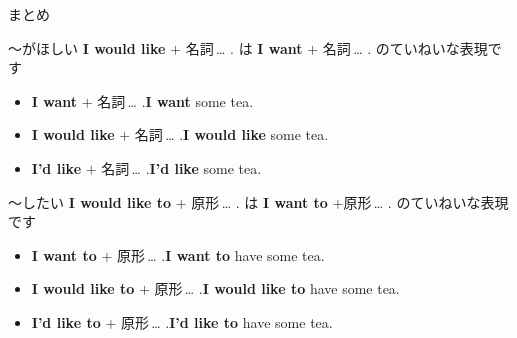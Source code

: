\documentclass[aspectratio=169,xcolor={dvipsnames,table}]{beamer}
\begin{document}
\begin{frame}[plain]{まとめ}
 \begin{block}{～がほしい}\small
\textbf{I would like} $+$ 名詞\,\ldots\,\,.\,\,は\,\,\textbf{I want} $+$ 名詞\,\ldots\,\,.\,\,のていねいな表現です
\begin{itemize}[square]\small
 \item \textbf{I want} $+$ 名詞\,\ldots\,\,.\hfill{\scriptsize \textbf{I want} some tea.}
 \item \textbf{I would like} $+$ 名詞\,\ldots\,\,.\hfill{\scriptsize \textbf{I would like} some tea.}
 \item \textbf{I'd like} $+$ 名詞\,\ldots\,\,.\hfill{\scriptsize \textbf{I'd like} some tea.}
       \end{itemize}
\end{block}

\begin{block}{～したい}\small
\textbf{I would like to} $+$ 原形\,\ldots\,\,.\,\,は\,\,\textbf{I want to} $+$原形\,\ldots\,\,.\,\,のていねいな表現です
\begin{itemize}[square]\small
 \item \textbf{I want to} $+$ 原形\,\ldots\,\,.\hfill{\scriptsize \textbf{I want to} have some tea.}
 \item \textbf{I would like to} $+$ 原形\,\ldots\,\,.\hfill{\scriptsize \textbf{I would like to} have some tea.}
 \item \textbf{I'd like to} $+$ 原形\,\ldots\,\,.\hfill{\scriptsize \textbf{I'd like to} have some tea.}
       \end{itemize}
\end{block}
\end{frame}
\end{document}
